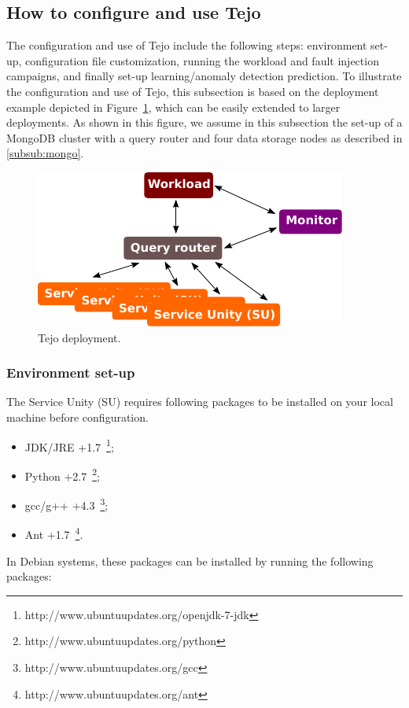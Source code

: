 \subsection{How to configure and use Tejo}
\label{subsec:conftejo}

The configuration and use of Tejo include the following steps: environment set-up, configuration file customization, running the workload and fault injection campaigns, and finally set-up learning/anomaly detection prediction. To illustrate the configuration and use of Tejo, this subsection is based on the deployment example depicted in Figure~\ref{fig:tejo_cluster}, which can be easily extended to larger deployments. As shown in this figure, we assume in this subsection the set-up of a MongoDB cluster with a query router and four data storage nodes as described in \ref{subsub:mongo}.

\begin{figure}[!h]
  \centering
     \includegraphics[width=.6\textwidth]{inputs/img/tejo_cluster}
  \caption{Tejo deployment.}
  \label{fig:tejo_cluster}
\end{figure}

\subsubsection{Environment set-up}

The Service Unity (SU) requires following packages to be installed on your local machine before configuration.

\begin{itemize}
	\item JDK/JRE +1.7~\footnote{http://www.ubuntuupdates.org/openjdk-7-jdk};
	\item Python +2.7~\footnote{http://www.ubuntuupdates.org/python};
	\item gcc/g++ +4.3~\footnote{http://www.ubuntuupdates.org/gcc};
	\item Ant +1.7~\footnote{http://www.ubuntuupdates.org/ant}.
\end{itemize}

In Debian systems, these packages can be installed by running the following packages:

